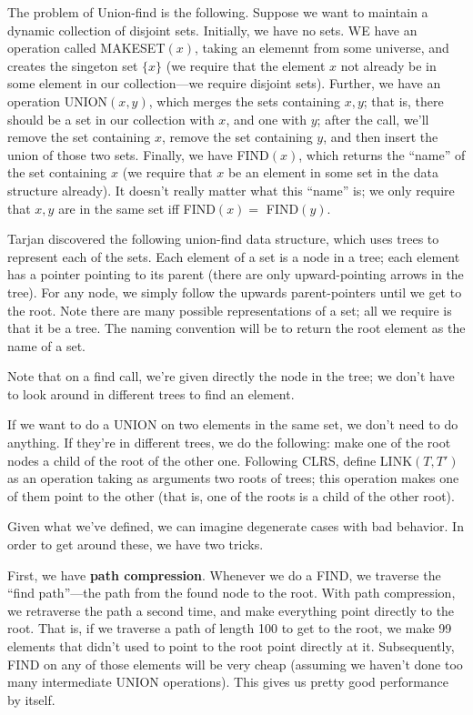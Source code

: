 \documentclass{article}
\begin{document}
The problem of Union-find is the following.
Suppose we want to maintain a dynamic collection of disjoint sets.
Initially, we have no sets.
WE have an operation called MAKESET$(x)$, taking an elemennt from some
universe, and creates the singeton set $\{x\}$ (we require that the element
$x$ not already be in some element in our collection---we require
disjoint sets).
Further, we have an operation UNION$(x,y)$, which merges the sets
containing $x,y$; that is, there should be a set in our collection with $x$,
and one with $y$; after the call, we'll remove the set containing $x$, remove
the set containing $y$, and then insert the union of those two sets.
Finally, we have FIND$(x)$, which returns the ``name'' of the set
containing $x$ (we require that $x$ be an element in some set in the data
structure already).
It doesn't really matter what this ``name'' is; we only require that
$x,y$ are in the same set iff FIND$(x) =$ FIND$(y)$.


Tarjan discovered the following union-find data structure, which uses
trees to represent each of the sets.
Each element of a set is a node in a tree; each element has a pointer
pointing to its parent (there are only upward-pointing arrows in the tree).
For any node, we simply follow the upwards parent-pointers until we get
to the root.
Note there are many possible representations of a set; all we require
is that it be a tree.
The naming convention will be to return the root element as the name
of a set.

Note that on a find call, we're given directly the node in the tree;
we don't have to look around in different trees to find an element.

If we want to do a UNION on two elements in the same set, we don't need
to do anything. If they're in different trees, we do the following:
make one of the root nodes a child of the root of the other one.
Following CLRS, define LINK$(T,T')$ as an operation taking as arguments two
roots of trees; this operation makes one of them point to the other (that is,
one of the roots is a child of the other root).

Given what we've defined, we can imagine degenerate cases with bad behavior.
In order to get around these, we have two tricks.


First, we have \textbf{path compression}.
Whenever we do a FIND, we traverse the ``find path''---the path from the
found node to the root.
With path compression, we retraverse the path a second time, and make
everything point directly to the root.
That is, if we traverse a path of length 100 to get to the root, we make
99 elements that didn't used to point to the root point directly at it.
Subsequently, FIND on any of those elements will be very cheap (assuming
we haven't done too many intermediate UNION operations).
This gives us pretty good performance by itself.
\end{document}
